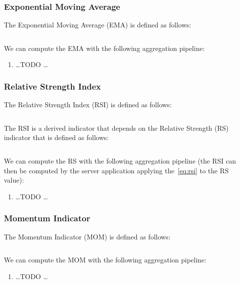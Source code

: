 \subsubsection{Exponential Moving Average}

The Exponential Moving Average (EMA) is defined as follows:

\begin{equation}\label{eq:ema}
\end{equation}

We can compute the EMA with the following aggregation pipeline:

\begin{enumerate}
	\item \ldots TODO \ldots
\end{enumerate}

\subsubsection{Relative Strength Index}

The Relative Strength Index (RSI) is defined as follows:

\begin{equation}\label{eq:rsi}
\end{equation}

The RSI is a derived indicator that depends on the Relative Strength (RS)
indicator that is defined as follows:

\begin{equation}\label{eq:rs}
\end{equation}

We can compute the RS with the following aggregation pipeline (the RSI can then
be computed by the server application applying the~\eqref{eq:rsi} to the RS
value):

\begin{enumerate}
	\item \ldots TODO \ldots
\end{enumerate}

\subsubsection{Momentum Indicator}

The Momentum Indicator (MOM) is defined as follows:

\begin{equation}\label{eq:mom}
\end{equation}

We can compute the MOM with the following aggregation pipeline:

\begin{enumerate}
	\item \ldots TODO \ldots
\end{enumerate}
